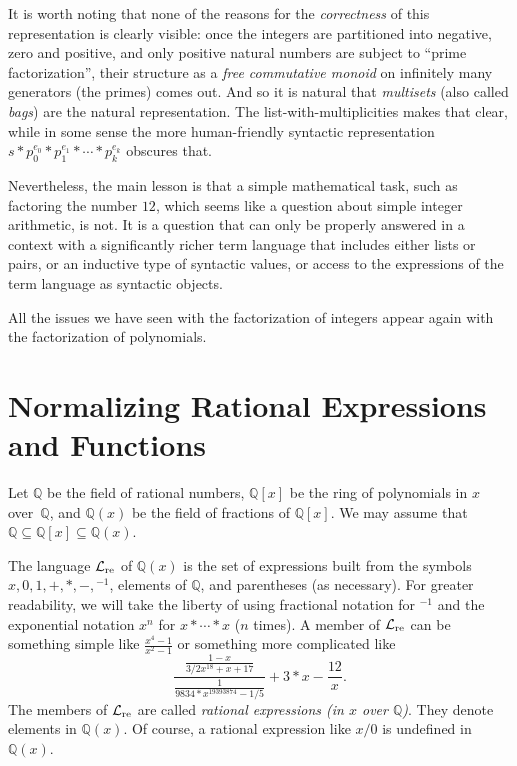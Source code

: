 \documentclass[fleqn]{llncs}
\newcommand{\QQ}{\ensuremath{\mathbb{Q}}}
\newcommand{\Langre}{\ensuremath{\mathcal{L}}_{\rm re}}
\begin{document}
It is worth noting that none of the reasons for the \emph{correctness}
of this representation is clearly visible: once the integers are
partitioned into negative, zero and positive, and only positive
natural numbers are subject to ``prime factorization'', their structure
as a \emph{free commutative monoid} on infinitely many generators (the primes)
comes out. And so it is natural that \emph{multisets} (also called \emph{bags})
are the natural representation. The list-with-multiplicities makes that
clear, while in some sense the more human-friendly syntactic representation
$s * p_0^{e_0} * p_1^{e_1} * \cdots * p_k^{e_k}$ obscures that.

Nevertheless, the main lesson is that a simple mathematical task, such
as factoring the number $12$, which seems like a question about simple
integer arithmetic, is not.  It is a question that can only be
properly answered in a context with a significantly richer term
language that includes either lists or pairs, or an inductive type of
syntactic values, or access to the expressions of the term language as
syntactic objects.

All the issues we have seen with the factorization of integers appear
again with the factorization of polynomials.

\section{Normalizing Rational Expressions and Functions}\label{sec:rational}

Let $\QQ$ be the field of rational numbers, $\QQ[x]$ be the ring of
polynomials in $x$ over~$\QQ$, and $\QQ(x)$ be the field of fractions
of $\QQ[x]$.  We may assume that \mbox{$\QQ \subseteq \QQ[x] \subseteq
\QQ(x)$}.  

The language $\Langre$ of $\QQ(x)$ is the set of expressions built from
the symbols $x, 0, 1, +, *, -, \phantom{}^{-1}$, elements of $\QQ$,
and parentheses (as necessary).  For greater readability, we will take
the liberty of using fractional notation for $\phantom{}^{-1}$ and the
exponential notation $x^n$ for $x * \cdots * x$ ($n$ times).  A member
of $\Langre$ can be something simple like $\frac{x^4-1}{x^2-1}$ or
something more complicated like
\begin{equation*}
\frac{\frac{1-x}{3/2 x^{18} + x + 17}}
     {\frac{1}{9834*x^{19393874}-1/5}}+3*x -\frac{12}{x}.
\end{equation*}
The members of $\Langre$ are called \emph{rational expressions (in $x$
  over $\QQ$)}.  They denote elements in $\QQ(x)$.  Of course, a
rational expression like $x/0$ is undefined in $\QQ(x)$.
\end{document}
